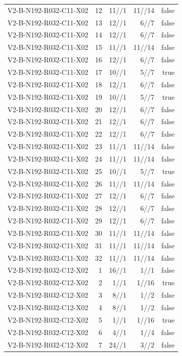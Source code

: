 {\begin{longtable}{lrrrr}
V2-B-N192-R032-C11-X02 & 12 & 11//1 & 11//14 & false \\
V2-B-N192-R032-C11-X02 & 13 & 12//1 & 6//7 & false \\
V2-B-N192-R032-C11-X02 & 14 & 12//1 & 6//7 & false \\
V2-B-N192-R032-C11-X02 & 15 & 11//1 & 11//14 & false \\
V2-B-N192-R032-C11-X02 & 16 & 12//1 & 6//7 & false \\
V2-B-N192-R032-C11-X02 & 17 & 10//1 & 5//7 & true \\
V2-B-N192-R032-C11-X02 & 18 & 12//1 & 6//7 & false \\
V2-B-N192-R032-C11-X02 & 19 & 10//1 & 5//7 & true \\
V2-B-N192-R032-C11-X02 & 20 & 12//1 & 6//7 & false \\
V2-B-N192-R032-C11-X02 & 21 & 12//1 & 6//7 & false \\
V2-B-N192-R032-C11-X02 & 22 & 12//1 & 6//7 & false \\
V2-B-N192-R032-C11-X02 & 23 & 11//1 & 11//14 & false \\
V2-B-N192-R032-C11-X02 & 24 & 11//1 & 11//14 & false \\
V2-B-N192-R032-C11-X02 & 25 & 10//1 & 5//7 & true \\
V2-B-N192-R032-C11-X02 & 26 & 11//1 & 11//14 & false \\
V2-B-N192-R032-C11-X02 & 27 & 12//1 & 6//7 & false \\
V2-B-N192-R032-C11-X02 & 28 & 12//1 & 6//7 & false \\
V2-B-N192-R032-C11-X02 & 29 & 12//1 & 6//7 & false \\
V2-B-N192-R032-C11-X02 & 30 & 11//1 & 11//14 & false \\
V2-B-N192-R032-C11-X02 & 31 & 11//1 & 11//14 & false \\
V2-B-N192-R032-C11-X02 & 32 & 11//1 & 11//14 & false \\
V2-B-N192-R032-C12-X02 & 1 & 16//1 & 1//1 & false \\
V2-B-N192-R032-C12-X02 & 2 & 1//1 & 1//16 & true \\
V2-B-N192-R032-C12-X02 & 3 & 8//1 & 1//2 & false \\
V2-B-N192-R032-C12-X02 & 4 & 8//1 & 1//2 & false \\
V2-B-N192-R032-C12-X02 & 5 & 1//1 & 1//16 & true \\
V2-B-N192-R032-C12-X02 & 6 & 4//1 & 1//4 & false \\
V2-B-N192-R032-C12-X02 & 7 & 24//1 & 3//2 & false \\

\end{longtable}}
